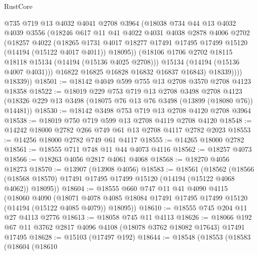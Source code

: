 \begin{lexlean}{RustCore}
\begin{coremodule}
                @735
                @719
                @13
                @4032
                @4041
                @2708
                @3964
                (@18038
                  @734
                  @44
                  @13
                  @4032
                  @4039
                  @3556
                  (@18246
                    @617
                    @11
                    @41
                    @4022
                    @4031
                    @4038
                    @2878
                    @4006
                    @2702
                    (@18257
                      @4022
                      (@18265
                        @1731
                        @4017
                        @18277
                        @17491
                        @17495
                        @17499
                        @15120
                        (@14194 (@15122 @4017 @4011))
                        @18095))
                    (@18106 @1706 @2702 @18115 @18118 @15134 (@14194 (@15136 @4025 @2708)))
                    @15134
                    (@14194 (@15136 @4007 @4031)))
                  @16822
                  @16825
                  @16828
                  @16832
                  @16837
                  @16843)
                @18339))))
        @18339))
@18501 := @18142 @4049 @599 @755 @13 @2708 @3570 @2708 @4123 @18358
@18522 := @18019
    @229
    @753
    @719
    @13
    @2708
    @3498
    @2708
    @4123
    (@18326 @229 @13 @3498 (@18075 @76 @13 @76 @3498 (@13899 (@18080 @76)) @14481))
@18530 := @18142 @3498 @753 @719 @13 @2708 @4120 @2708 @3964
@18538 := @18019 @750 @719 @599 @13 @2708 @4119 @2708 @4120
@18548 := @14242 @18000 @2782 @266 @749 @61 @13 @2708 @4117 @2782 @2023
@18553 := @14256 @18000 @2782 @749 @61 @4117
@18555 := @14265 @18000 @2782
@18561 := @18555 @711 @748 @11 @44 @4073 @4116
@18562 := @18257 @4073
@18566 := @18263 @4056 @2817 @4061 @4068
@18568 := @18270 @4056 @18273
@18570 := @13907 (@13908 @4056)
@18583 := @18561
    (@18562
      (@18566 (@18568 @18570) @17491 @17495 @17499 @15120 (@14194 (@15122 @4068 @4062)) @18095))
@18604 := @18555
    @660
    @747
    @11
    @41
    @4090
    @4115
    (@18060
      @4090
      (@18071 @4078 @4085 @18084 @17491 @17495 @17499 @15120 (@14194 (@15122 @4085 @4079)) @18095))
@18610 := @18555 @745 @204 @11 @27 @4113 @2776
@18613 := @18058 @745 @11 @4113
@18626 := @18066 @192 @67 @11 @3762 @2817 @4096 @4108 (@18078 @3762 @18082 @17643) @17491 @17495
@18628 := @15103 (@17497 @192)
@18644 := @18548
    (@18553
      (@18583
        (@18604
          (@18610

\end{coremodule}
\end{lexlean}
